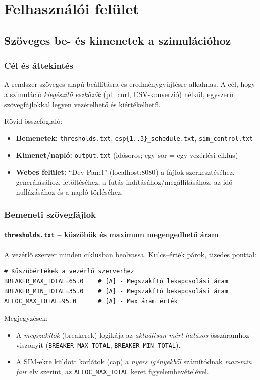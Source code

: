 \chapter{Felhasználói felület}

\section{Szöveges be- és kimenetek a szimulációhoz}

\subsection{Cél és áttekintés}
A rendszer szöveges alapú beállításra és eredménygyűjtésre alkalmas. 
A cél, hogy a szimuláció \emph{kiegészítő eszközök} (pl.\ curl, CSV-konverzió) nélkül, 
egyszerű szövegfájlokkal legyen vezérelhető és kiértékelhető.

\noindent Rövid összefoglaló:
\begin{itemize}
  \item \textbf{Bemenetek:} \texttt{thresholds.txt}, \texttt{esp\{1..3\}\_schedule.txt}, \texttt{sim\_control.txt}
  \item \textbf{Kimenet/napló:} \texttt{output.txt} (idősoros; egy sor = egy vezérlési ciklus)
  \item \textbf{Webes felület:} ``Dev Panel'' (localhost:8080) a fájlok szerkesztéséhez, generálásához, 
  letöltéséhez, a futás indításához/megállításához, az idő nullázásához és a napló törléséhez.
\end{itemize}

\subsection{Bemeneti szövegfájlok}

\subsubsection{\texttt{thresholds.txt} -- küszöbök és maximum megengedhető áram}
A vezérlő szerver minden ciklusban beolvassa. Kulcs--érték párok, tizedes ponttal:
\begin{verbatim}
# Küszöbértékek a vezérlő szerverhez
BREAKER_MAX_TOTAL=65.0    # [A] - Megszakító lekapcsolási áram
BREAKER_MIN_TOTAL=35.0    # [A] - Megszakító bekapcsolási áram
ALLOC_MAX_TOTAL=95.0      # [A] - Max áram érték
\end{verbatim}

\noindent Megjegyzések:
\begin{itemize}
  \item A \emph{megszakítók} (breakerek) logikája az \emph{aktuálisan mért hatásos} összáramhoz 
  viszonyít (\texttt{BREAKER\_MAX\_TOTAL}, \texttt{BREAKER\_MIN\_TOTAL}).
  \item A SIM-ekre küldött korlátok (cap) a \emph{nyers igényekből} számítódnak \emph{max-min fair} elv 
  szerint, az \texttt{ALLOC\_MAX\_TOTAL} keret figyelembevételével.
\end{itemize}

